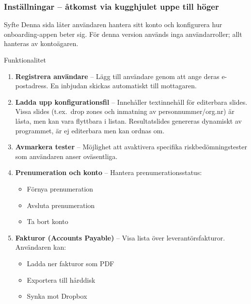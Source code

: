 \documentclass[10pt]{beamer}
\begin{document}
\begin{frame}[fragile]
  \frametitle{Inställningar – åtkomst via kugghjulet uppe till höger}

  \begin{block}{Syfte}
    Denna sida låter användaren hantera sitt konto och konfigurera hur onboarding-appen beter sig.
    För denna version används inga användarroller; allt hanteras av kontoägaren.
  \end{block}

  \vspace{0.4cm}

  \begin{block}{Funktionalitet}
    \begin{enumerate}
      \item \textbf{Registrera användare} – Lägg till användare genom att ange deras e-postadress.
      En inbjudan skickas automatiskt till mottagaren.
      \vspace{0.2cm}
      \item \textbf{Ladda upp konfigurationsfil} – Innehåller textinnehåll för editerbara slides.
      Vissa slides (t.ex.\ drop zones och inmatning av personnummer/org.nr) är låsta, men kan vara flyttbara i listan.
      Resultatslides genereras dynamiskt av programmet, är ej editerbara men kan ordnas om.
      \vspace{0.2cm}
      \item \textbf{Avmarkera tester} – Möjlighet att avaktivera specifika riskbedömningstester som användaren anser oväsentliga.
      \vspace{0.2cm}
      \item \textbf{Prenumeration och konto} – Hantera prenumerationsstatus:
        \begin{itemize}
          \item Förnya prenumeration
          \item Avsluta prenumeration
          \item Ta bort konto
        \end{itemize}
      \vspace{0.2cm}
      \item \textbf{Fakturor (Accounts Payable)} – Visa lista över leverantörsfakturor.
      Användaren kan:
        \begin{itemize}
          \item Ladda ner fakturor som PDF
          \item Exportera till hårddisk
          \item Synka mot Dropbox
        \end{itemize}
    \end{enumerate}
  \end{block}


\end{frame}
\end{document}
